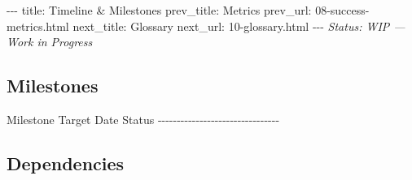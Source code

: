\documentclass[12pt,a4paper]{article}
\begin{document}
-\/-\/- title: Timeline \& Milestones prev\_title: Metrics prev\_url:
08-success-metrics.html next\_title: Glossary next\_url:
10-glossary.html -\/-\/- \emph{Status: WIP --- Work in Progress}

\subsection{Milestones}\label{milestones}

\textbar{} Milestone \textbar{} Target Date \textbar{} Status \textbar{}
\textbar-\/-\/-\/-\/-\/-\/-\/-\/-\/-\/-\textbar-\/-\/-\/-\/-\/-\/-\/-\/-\/-\/-\/-\/-\textbar-\/-\/-\/-\/-\/-\/-\/-\textbar{}
\textbar{} \textbar{} \textbar{} \textbar{}

\subsection{Dependencies}\label{dependencies}
\end{document}
